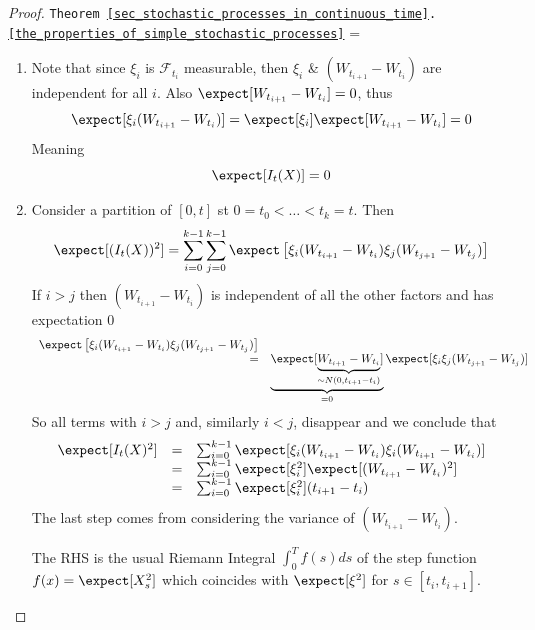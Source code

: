 \documentclass[11pt,a4paper]{article}
\begin{document}
  \begin{proof}{\texttt{Theorem \ref{sec_stochastic_processes_in_continuous_time}.\ref{the_properties_of_simple_stochastic_processes}}}
    \everymath={\displaystyle}
    \begin{enumerate}
      \item Note that since $\xi_i$ is $\mathcal{F}_{t_i}$ measurable, then $\xi_i$ \& $(W_{t_{i+1}}-W_{t_i})$ are independent for all $i$. Also $\expect[W_{t_{i+1}}-W_{t_i}]=0$, thus
      \[ \expect[\xi_i(W_{t_{i+1}}-W_{t_i})]=\expect[\xi_i]\expect[W_{t_{i+1}}-W_{t_i}]=0 \]
      Meaning
      \[ \expect[I_t(X)]=0 \]

      \item Consider a partition of $[0,t]$ st $0=t_0<\dots<t_k=t$. Then
      \[ \expect[(I_t(X))^2]=\sum_{i=0}^{k-1}\sum_{j=0}^{k-1}\expect\left[\xi_i(W_{t_{i+1}}-W_{t_i})\xi_j(W_{t_{j+1}}-W_{t_j})\right] \]
      If $i>j$ then $(W_{t_{i+1}}-W_{t_i})$ is independent of all the other factors and has expectation 0
      \[\begin{array}{rl}
        \expect\left[\xi_i(W_{t_{i+1}}-W_{t_i})\xi_j(W_{t_{j+1}}-W_{t_j})\right]\\
        =&\underbrace{\expect[\underbrace{W_{t_{i+1}}-W_{t_i}}_{\sim N(0,t_{i+1}-t_i)}]}_{=0}\expect[\xi_i\xi_j(W_{t_{j+1}}-W_{t_j})]
      \end{array}\]
      So all terms with $i>j$ and, similarly $i<j$, disappear and we conclude that
      \[\begin{array}{rcl}
        \expect[I_t(X)^2]&=&\sum_{i=0}^{k-1}\expect[\xi_i(W_{t_{i+1}}-W_{t_i})\xi_i(W_{t_{i+1}}-W_{t_i})]\\
        &=&\sum_{i=0}^{k-1}\expect[\xi_i^2]\expect[(W_{t_{i+1}}-W_{t_i})^2]\\
        &=&\sum_{i=0}^{k-1}\expect[\xi_i^2](t_{i+1}-t_i)
      \end{array}\]
      The last step comes from considering the variance of $(W_{t_{i+1}}-W_{t_i})$.
      \par The RHS is the usual Riemann Integral $\int_0^Tf(s)ds$ of the step function $f(x)=\expect[X_s^2]$ which coincides with $\expect[\xi^2]$ for $s\in[t_i,t_{i+1}]$.


\end{enumerate}
\end{proof}
\end{document}

